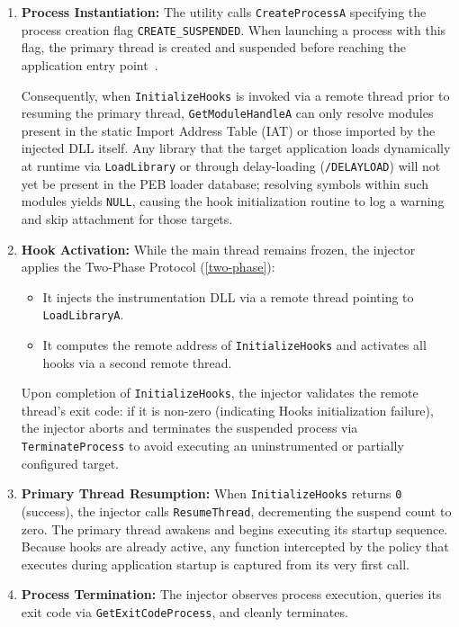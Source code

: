 \begin{enumerate}
	\item \textbf{Process Instantiation:} The utility calls \texttt{CreateProcessA} specifying the process creation flag \texttt{CREATE\_SUSPENDED}.
	When launching a process with this flag, the primary thread is created and suspended before reaching the application entry point~\cite{book:windows_internals}.
	
	Consequently, when \texttt{InitializeHooks} is invoked via a remote thread prior to resuming the primary thread, \texttt{GetModuleHandleA} can only resolve modules present in the static Import Address Table (IAT) or those imported by the injected \ac{DLL} itself. Any library that the target application loads dynamically at runtime via \texttt{LoadLibrary} or through delay-loading (\texttt{/DELAYLOAD}) will not yet be present in the PEB loader database; resolving symbols within such modules yields \texttt{NULL}, causing the hook initialization routine to log a warning and skip attachment for those targets.
	\item \textbf{Hook Activation:} While the main thread remains frozen, the injector applies the Two-Phase Protocol (\cref{two-phase}):
	\begin{itemize}
		\item It injects the instrumentation \ac{DLL} via a remote thread pointing to \texttt{LoadLibraryA}.
		\item It computes the remote address of \texttt{InitializeHooks} and activates all hooks via a second remote thread.
	\end{itemize}
	Upon completion of \texttt{InitializeHooks}, the injector validates the remote thread's exit code: if it is non-zero (indicating Hooks initialization failure), the injector aborts and terminates the suspended process via \texttt{TerminateProcess} to avoid executing an uninstrumented or partially configured target.
	\item \textbf{Primary Thread Resumption:} When \texttt{InitializeHooks} returns \texttt{0} (success), the injector calls \texttt{ResumeThread}, decrementing the suspend count to zero.
	The primary thread awakens and begins executing its startup sequence.
	Because hooks are already active, any function intercepted by the policy that executes during application startup is captured from its very first call.
	\item \textbf{Process Termination:} The injector observes process execution, queries its exit code via \texttt{GetExitCodeProcess}, and cleanly terminates.
\end{enumerate}

